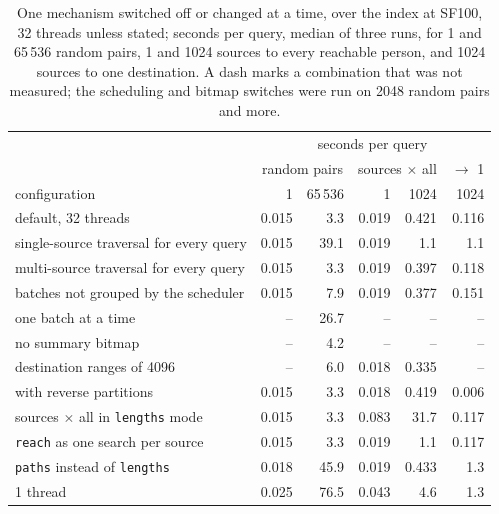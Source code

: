 \begin{table}[t]\centering\scriptsize\setlength{\tabcolsep}{2.6pt}
\caption{One mechanism switched off or changed at a time, over the index at SF100, 32 threads unless stated; seconds per query, median of three runs, for 1 and 65\,536 random pairs, 1 and 1024 sources to every reachable person, and 1024 sources to one destination. A dash marks a combination that was not measured; the scheduling and bitmap switches were run on 2048 random pairs and more.}\label{tab:ablation}
\begin{tabular}{lrrrrr}\toprule
 & \multicolumn{5}{c}{seconds per query} \\
 & \multicolumn{2}{c}{random pairs} & \multicolumn{2}{c}{sources $\times$ all} & $\to$ 1 \\
configuration & 1 & 65\,536 & 1 & 1024 & 1024 \\ \midrule
default, 32 threads & 0.015 & 3.3 & 0.019 & 0.421 & 0.116 \\
single-source traversal for every query & 0.015 & 39.1 & 0.019 & 1.1 & 1.1 \\
multi-source traversal for every query & 0.015 & 3.3 & 0.019 & 0.397 & 0.118 \\
batches not grouped by the scheduler & 0.015 & 7.9 & 0.019 & 0.377 & 0.151 \\
one batch at a time & -- & 26.7 & -- & -- & -- \\
no summary bitmap & -- & 4.2 & -- & -- & -- \\
destination ranges of 4096 & -- & 6.0 & 0.018 & 0.335 & -- \\
with reverse partitions & 0.015 & 3.3 & 0.018 & 0.419 & 0.006 \\
sources $\times$ all in \texttt{lengths} mode & 0.015 & 3.3 & 0.083 & 31.7 & 0.117 \\
\texttt{reach} as one search per source & 0.015 & 3.3 & 0.019 & 1.1 & 0.117 \\
\texttt{paths} instead of \texttt{lengths} & 0.018 & 45.9 & 0.019 & 0.433 & 1.3 \\
1 thread & 0.025 & 76.5 & 0.043 & 4.6 & 1.3 \\
\bottomrule\end{tabular}\end{table}
